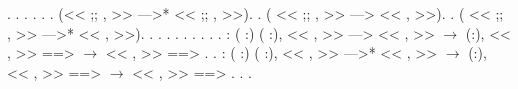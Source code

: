 \documentclass[12pt]{report}
\begin{document}
\begin{coqdoccode}
\coqdocnoindent
{}.\coqdoceol
\coqdocnoindent
{}.\coqdoceol
\coqdocnoindent
{} .\coqdoceol
\coqdocnoindent
{}  .\coqdoceol
\coqdocnoindent
{} .\coqdoceol
\coqdocnoindent
{}.\coqdoceol
\coqdocnoindent
{} (<<  ;; ,  >> --->* <<  ;; ,  >>).\coqdoceol
\coqdocnoindent
{}.\coqdoceol
\coqdocnoindent
{} ( <<  ;; ,  >> ---> << , >>).\coqdoceol
\coqdocnoindent
{} .\coqdoceol
\coqdocnoindent
{} ( <<  ;; ,  >> --->* << , >>).\coqdoceol
\coqdocnoindent
{} .\coqdoceol
\coqdocnoindent
{} .\coqdoceol
\coqdocnoindent
{} .\coqdoceol
\coqdocnoindent
{} .\coqdoceol
\coqdocnoindent
{} .\coqdoceol
\coqdocnoindent
{} .\coqdoceol
\coqdocnoindent
{} .\coqdoceol
\coqdocnoindent
{} .\coqdoceol
\coqdocnoindent
{}.\coqdoceol
\coqdocemptyline
\coqdocnoindent
{} : \coqdockw{\ensuremath{\forall}} ( :) ( :), << , >> ---> << , >> \ensuremath{\rightarrow} \coqdockw{\ensuremath{\forall}} (:), << , >> ==>  \ensuremath{\rightarrow} << , >> ==> .\coqdoceol
\coqdocnoindent
{}.\coqdoceol
\coqdocemptyline
\coqdocnoindent
{} : \coqdockw{\ensuremath{\forall}} ( :) ( :), << , >> --->* << , >> \ensuremath{\rightarrow} \coqdockw{\ensuremath{\forall}} (:), << , >> ==>  \ensuremath{\rightarrow} << , >> ==> .\coqdoceol
\coqdocnoindent
{}.\coqdoceol
\coqdocnoindent
{}     .\coqdoceol

\end{coqdoccode}
\end{document}
